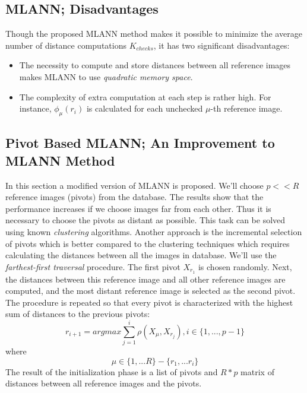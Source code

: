 \subsection{MLANN; Disadvantages}
Though the proposed MLANN method makes it possible to minimize the average number of distance computations $K_{checks}$, it has two significant disadvantages:
\begin{itemize}
	\item The necessity to compute and store distances between all reference images makes MLANN to use \textit{quadratic memory space}.
	
	\item The complexity of extra computation at each step is rather high. For instance, $\phi_\mu(r_i)$ is calculated for each unchecked $\mu$-th reference image.
\end{itemize}

\subsection{Pivot Based MLANN; An Improvement to MLANN Method}
In this section a modified version of MLANN is proposed. We'll choose $p << R$ reference images (pivots) from the database. The results show that the performance increases if we choose images far from each other. Thus it is necessary to choose the pivots as distant as possible. This task can be solved using known \textit{clustering} algorithms. Another approach is the incremental selection of pivots which is better compared to the clustering techniques which requires calculating the distances between all the images in database. We'll use the \textit{farthest-first traversal} procedure. The first pivot $X_{r_1}$ is chosen randomly. Next, the distances between this reference image and all other reference images are computed, and the most distant reference image is selected as the second pivot. The procedure is repeated so that every pivot is characterized with the highest sum of distances to the previous pivots:
\begin{equation}
	r_{i + 1} = argmax \sum_{j = 1}^{i}\rho(X_\mu, X_{r_j}), i \in \{1, ..., p - 1\}
\end{equation}
where 
$$
\mu \in \{1, ... R\} - \{r_1, ... r_i\}
$$
The result of the initialization phase is a list of pivots and $R * p$ matrix of distances between all reference images and the pivots.

